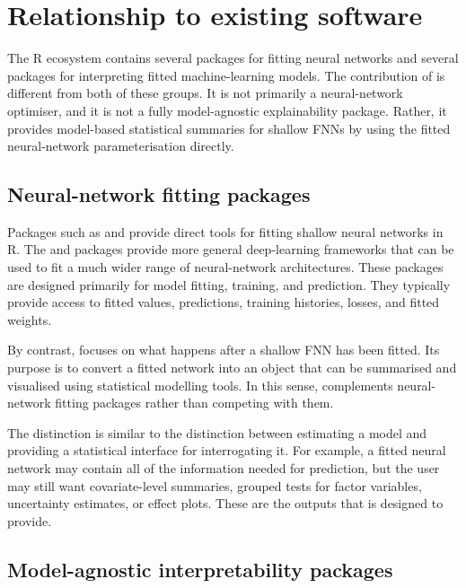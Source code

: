 \section{Relationship to existing software}\label{sec:software}

The R ecosystem contains several packages for fitting neural networks and several packages for interpreting fitted machine-learning models.
The contribution of  is different from both of these groups.
It is not primarily a neural-network optimiser, and it is not a fully model-agnostic explainability package.
Rather, it provides model-based statistical summaries for shallow FNNs by using the fitted neural-network parameterisation directly.

\subsection{Neural-network fitting packages}\label{neural-network-fitting-packages}

Packages such as  \citep{nnet} and  \citep{neuralnet} provide direct tools for fitting shallow neural networks in R.
The  \citep{keras} and  \citep{torch} packages provide more general deep-learning frameworks that can be used to fit a much wider range of neural-network architectures.
These packages are designed primarily for model fitting, training, and prediction.
They typically provide access to fitted values, predictions, training histories, losses, and fitted weights.

By contrast,  focuses on what happens after a shallow FNN has been fitted.
Its purpose is to convert a fitted network into an object that can be summarised and visualised using statistical modelling tools.
In this sense,  complements neural-network fitting packages rather than competing with them.

The distinction is similar to the distinction between estimating a model and providing a statistical interface for interrogating it.
For example, a fitted neural network may contain all of the information needed for prediction, but the user may still want covariate-level summaries, grouped tests for factor variables, uncertainty estimates, or effect plots.
These are the outputs that  is designed to provide.

\subsection{Model-agnostic interpretability packages}\label{model-agnostic-interpretability-packages}

